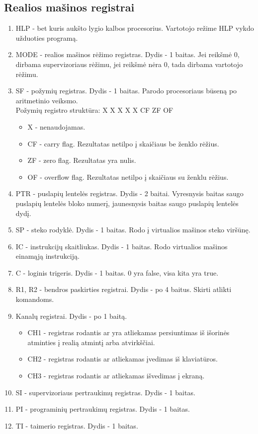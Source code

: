 	\subsection{Realios mašinos registrai}
	\begin{enumerate}
	\item HLP - bet kuris aukšto lygio kalbos procesorius. Vartotojo režime HLP vykdo užduoties programą.
	\item MODE - realios mašinos rėžimo registras. Dydis - 1 baitas. Jei reikšmė 0, dirbama supervizoriaus rėžimu, jei reikšmė nėra 0, tada dirbama vartotojo rėžimu.
	\item SF - požymių registras. Dydis - 1 baitas. Parodo procesoriaus būseną po aritmetinio veiksmo.\\
	Požymių registro struktūra: X X X X X CF ZF OF
	\begin{itemize}
		\item X - nenaudojamas.
		\item CF - carry flag. Rezultatas netilpo į skaičiaus be ženklo rėžius.
		\item ZF - zero flag. Rezultatas yra nulis.
		\item OF - overflow flag. Rezultatas netilpo į skaičiaus su ženklu rėžius.
	\end{itemize}
	\item PTR - puslapių lentelės registras. Dydis - 2 baitai. Vyresnysis baitas saugo puslapių lentelės bloko numerį, jaunesnysis baitas saugo puslapių lentelės dydį.
	\item SP - steko rodyklė. Dydis - 1 baitas. Rodo į virtualios mašinos steko viršūnę.
	\item IC - instrukcijų skaitliukas. Dydis - 1 baitas. Rodo virtualios mašinos einamąją instrukciją.
	\item C - loginis trigeris. Dydis - 1 baitas. 0 yra false, visa kita yra true.
	\item R1, R2 - bendros paskirties registrai. Dydis - po 4 baitus. Skirti atlikti komandoms.
	\item Kanalų registrai. Dydis - po 1 baitą.
	\begin{itemize}
		\item CH1 - registras rodantis ar yra atliekamas persiuntimas iš išorinės atminties į realią atmintį arba atvirkščiai.
		\item CH2 - registras rodantis ar atliekamas įvedimas iš klaviatūros.
		\item CH3 - registras rodantis ar atliekamas išvedimas į ekraną.
	\end{itemize}
	\item SI - supervizoriaus pertraukimų registras. Dydis - 1 baitas. 
	\item PI - programinių pertraukimų registras. Dydis - 1 baitas.
	\item TI - taimerio registras. Dydis - 1 baitas.
	
	\end{enumerate}	
	
